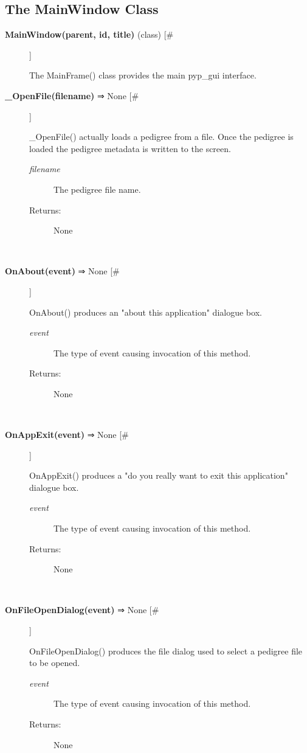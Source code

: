 \subsection*{The MainWindow Class}
\begin{description}
\item[\textbf{MainWindow(parent, id, title)} (class) [\#]
]
\par The MainFrame() class provides the main pyp\_gui interface.

\item[\textbf{\_OpenFile(filename)} ⇒ None [\#]
]
\par \_OpenFile() actually loads a pedigree from a file.  Once the pedigree is
loaded the pedigree metadata is written to the screen.
\begin{description}
\item[\textit{filename}
]
The pedigree file name.
\item[Returns:
]
None
\end{description}\\

\item[\textbf{OnAbout(event)} ⇒ None [\#]
]
\par OnAbout() produces an "about this application" dialogue box.
\begin{description}
\item[\textit{event}
]
The type of event causing invocation of this method.
\item[Returns:
]
None
\end{description}\\

\item[\textbf{OnAppExit(event)} ⇒ None [\#]
]
\par OnAppExit() produces a "do you really want to exit this application" dialogue box.
\begin{description}
\item[\textit{event}
]
The type of event causing invocation of this method.
\item[Returns:
]
None
\end{description}\\

\item[\textbf{OnFileOpenDialog(event)} ⇒ None [\#]
]
\par OnFileOpenDialog() produces the file dialog used to select a pedigree file to be opened.
\begin{description}
\item[\textit{event}
]
The type of event causing invocation of this method.
\item[Returns:
]
None
\end{description}\\


\end{description}

